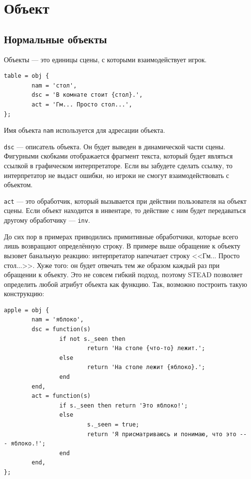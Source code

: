 \documentclass[a4paper,12pt]{article}
\begin{document}
\section{Объект}
\subsection{Нормальные объекты}
Объекты --- это единицы сцены, с которыми взаимодействует игрок.

\begin{verbatim}
table = obj {
        nam = 'стол',
        dsc = 'В комнате стоит {стол}.',
        act = 'Гм... Просто стол...',
};
\end{verbatim}

Имя объекта \verb/nam/ используется для адресации объекта.

\verb/dsc/ --- описатель объекта. Он будет выведен в динамической части сцены. Фигурными скобками отображается фрагмент текста, который будет являться ссылкой в графическом интерпретаторе. Если вы забудете сделать ссылку, то интерпретатор не выдаст ошибки, но игроки не смогут взаимодействовать с объектом.

\verb/act/ --- это обработчик, который вызывается при действии пользователя на объект сцены. Если объект находится в инвентаре, то действие с ним будет передаваться другому обработчику --- \verb/inv/.

До сих пор в примерах приводились примитивные обработчики, которые всего лишь возвращают определённую строку. В примере выше обращение к объекту вызовет банальную реакцию: интерпретатор напечатает строку <<Гм... Просто стол...>>. Хуже того: он будет отвечать тем же образом каждый раз при обращении к объекту. Это не совсем гибкий подход, поэтому STEAD позволяет определить любой атрибут объекта как функцию. Так, возможно построить такую конструкцию:

\begin{verbatim}
apple = obj {
        nam = 'яблоко',
        dsc = function(s)
                if not s._seen then
                        return 'На столе {что-то} лежит.';
                else
                        return 'На столе лежит {яблоко}.';
                end
        end,
        act = function(s)
                if s._seen then return 'Это яблоко!';
                else
                        s._seen = true;
                        return 'Я присматриваюсь и понимаю, что это --- яблоко.!';
                end
        end,
};
\end{verbatim}
\end{document}
